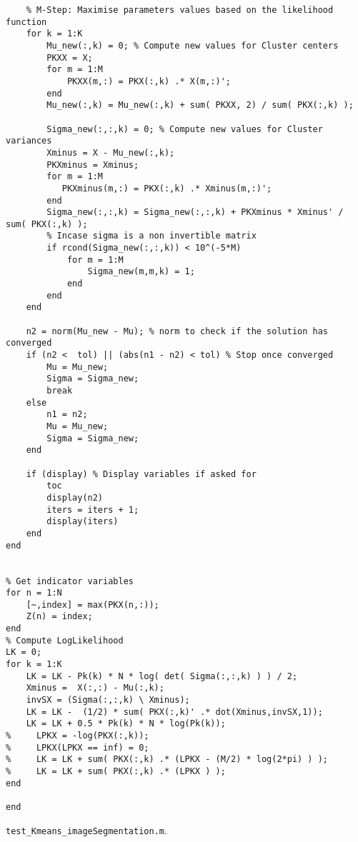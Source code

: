 \documentclass{article}
\begin{document}
\begin{lstlisting}
    % M-Step: Maximise parameters values based on the likelihood function
    for k = 1:K
        Mu_new(:,k) = 0; % Compute new values for Cluster centers
        PKXX = X;
        for m = 1:M
            PKXX(m,:) = PKX(:,k) .* X(m,:)';
        end
        Mu_new(:,k) = Mu_new(:,k) + sum( PKXX, 2) / sum( PKX(:,k) );
        
        Sigma_new(:,:,k) = 0; % Compute new values for Cluster variances
        Xminus = X - Mu_new(:,k);
        PKXminus = Xminus;
        for m = 1:M
           PKXminus(m,:) = PKX(:,k) .* Xminus(m,:)';
        end
        Sigma_new(:,:,k) = Sigma_new(:,:,k) + PKXminus * Xminus' / sum( PKX(:,k) );
        % Incase sigma is a non invertible matrix
        if rcond(Sigma_new(:,:,k)) < 10^(-5*M)
            for m = 1:M
                Sigma_new(m,m,k) = 1;
            end
        end
    end
    
    n2 = norm(Mu_new - Mu); % norm to check if the solution has converged
    if (n2 <  tol) || (abs(n1 - n2) < tol) % Stop once converged
        Mu = Mu_new;
        Sigma = Sigma_new;
        break
    else
        n1 = n2;
        Mu = Mu_new;
        Sigma = Sigma_new;
    end

    if (display) % Display variables if asked for
        toc
        display(n2)
        iters = iters + 1;
        display(iters)
    end
end


% Get indicator variables
for n = 1:N
    [~,index] = max(PKX(n,:));
    Z(n) = index;
end
% Compute LogLikelihood
LK = 0;
for k = 1:K
    LK = LK - Pk(k) * N * log( det( Sigma(:,:,k) ) ) / 2;
    Xminus =  X(:,:) - Mu(:,k);
    invSX = (Sigma(:,:,k) \ Xminus);
    LK = LK -  (1/2) * sum( PKX(:,k)' .* dot(Xminus,invSX,1));
    LK = LK + 0.5 * Pk(k) * N * log(Pk(k));
%     LPKX = -log(PKX(:,k));
%     LPKX(LPKX == inf) = 0;
%     LK = LK + sum( PKX(:,k) .* (LPKX - (M/2) * log(2*pi) ) );
%     LK = LK + sum( PKX(:,k) .* (LPKX ) );
end

end
\end{lstlisting}


\texttt{test\_Kmeans\_imageSegmentation.m}. 
\end{document}
